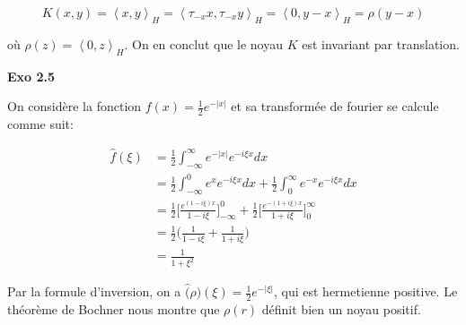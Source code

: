\documentclass[11pt]{article}
\begin{document}
    \vspace{-2.5em}
    $$
      K(x, y) = \left \langle x, y \right \rangle_H = \left \langle \tau_{-x} x, \tau_{-x} y \right \rangle_H  = \left \langle 0, y-x \right \rangle_H = \rho (y-x)
    $$
    \vspace{-4em}

    où $\rho(z) = \left \langle 0, z \right \rangle_H$. On en conclut que le noyau $K$ est invariant par translation.

    \textbf{Exo 2.5}

    On considère la fonction $f(x) = \frac{1}{2} e^{-|x|}$ et sa transformée de fourier se calcule comme suit:

    \vspace{-4em}
    \begin{align*}
      \hat{f}(\xi) &= \frac{1}{2} \int_{-\infty}^\infty e^{-|x|} e^{-i\xi x}dx \\
      &= \frac{1}{2} \int_{-\infty}^0 e^{x} e^{-i\xi x}dx + \frac{1}{2} \int_0^{\infty} e^{-x} e^{-i\xi x}dx  \\
      &= \frac{1}{2} \Big [\frac{e^{(1 - i\xi)x}}{1-i\xi} \Big ]_{-\infty}^0 + \frac{1}{2} \Big [\frac{e^{-(1 + i\xi)x}}{1+i\xi} \Big ]_0^{\infty} \\
      &= \frac{1}{2} \Big ( \frac{1}{1 - i\xi} + \frac{1}{1 + i \xi} \Big ) \\
      &= \frac{1}{1 + \xi^2}
    \end{align*}
    \vspace{-4em}

    Par la formule d'inversion, on a $\hat(\rho) (\xi) = \frac{1}{2} e^{-|\xi|}$, qui est hermetienne positive. Le théorème de Bochner nous montre que $\rho(r)$ définit bien un noyau positif.
\end{document}

